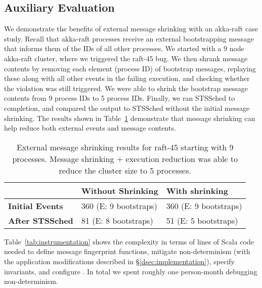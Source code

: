 \subsection{Auxiliary Evaluation}

 We demonstrate the benefits of
external message shrinking with an akka-raft case study. Recall that akka-raft
processes receive an external bootstrapping message that informs
them of the IDs of all other processes. We started with a 9 node akka-raft
cluster, where we triggered the raft-45 bug.
We then shrank message contents by removing each element (process ID) of bootstrap messages,
replaying these along with all other events in the failing execution, and
checking whether the violation was still triggered. We were able to shrink the
bootstrap message contents from 9 process IDs to 5 process IDs. Finally, we
ran STSSched to completion, and compared the output to STSSched without the
initial message shrinking. The results shown in
Table~\ref{tab:message_shrinking} demonstrate that message shrinking can help
reduce both external events and message contents.

\begin{table}
\centering
\begin{tabular}{|l|l|l|}
  \cline{2-3}
  \multicolumn{1}{c|}{~} & \textbf{Without Shrinking} & \textbf{With
  shrinking} \\\cline{2-3} \hline
{\textbf{Initial Events}} & 360 \hfill (E: 9 bootstraps) & 360 \hfill (E: 9 bootstraps) \\
\hline
{\textbf{After STSSched}} & 81 \hfill (E: 8 bootstraps) & 51 \hfill (E: 5 bootstraps) \\
\hline
\end{tabular}
\caption{External message shrinking results for raft-45 starting with 9
processes. Message shrinking + execution reduction was able to reduce the cluster
size to 5 processes.}
\label{tab:message_shrinking}
\end{table}

 Table~\ref{tab:instrumentation} shows
the complexity in terms of lines of Scala code needed to define message fingerprint
functions, mitigate non-determinism (with the application modifications
described in \S\ref{dsec:implementation}), specify invariants, and configure
\sys. In total we spent roughly one person-month debugging
non-determinism.

